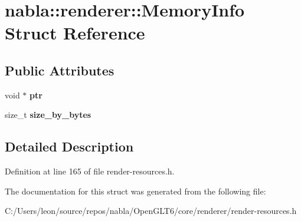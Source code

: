 \hypertarget{structnabla_1_1renderer_1_1_memory_info}{}\section{nabla\+::renderer\+::Memory\+Info Struct Reference}
\label{structnabla_1_1renderer_1_1_memory_info}
\subsection*{Public Attributes}
\begin{DoxyCompactItemize}
\item 
\mbox{\label{structnabla_1_1renderer_1_1_memory_info_a135c5c4c418b1c1fa2a5e4e8b6ba882b}} 
void $\ast$ {\bfseries ptr}
\item 
\mbox{\label{structnabla_1_1renderer_1_1_memory_info_a874055bab5fe3a33c6a0b1b62af8fa26}} 
size\+\_\+t {\bfseries size\+\_\+by\+\_\+bytes}
\end{DoxyCompactItemize}


\subsection{Detailed Description}


Definition at line 165 of file render-\/resources.\+h.



The documentation for this struct was generated from the following file\+:\begin{DoxyCompactItemize}
\item 
C\+:/\+Users/leon/source/repos/nabla/\+Open\+G\+L\+T6/core/renderer/render-\/resources.\+h\end{DoxyCompactItemize}
